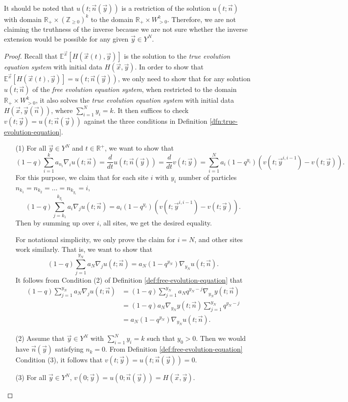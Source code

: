 \begin{remark}
It should be noted that $u(t;\vec{n}(\vec{y}))$ is a restriction of the solution $u(t;\vec{n})$ with domain $\mathbb{R}_+ \times (\mathbb{Z}_{\ge 0})^k$ to the domain $\mathbb{R}_+ \times W_{>0}^k$. Therefore, we are not claiming the truthness of the inverse because we are not sure whether the inverse extension would be possible for any given $\vec{y} \in Y^N$.
\end{remark}

\begin{proof}
Recall that $\mathbb{E}^{\vec{x}}[H(\vec{x}(t), \vec{y})]$ is the solution to the \emph{true evolution equation system} with initial data $H(\vec{x}, \vec{y})$. In order to show that $\mathbb{E}^{\vec{x}}[H(\vec{x}(t), \vec{y})] = u(t;\vec{n}(\vec{y}))$, we only need to show that for any solution $u(t;\vec{n})$ of the \emph{free evolution equation system}, when restricted to the domain $\mathbb{R}_+ \times W_{>0}^k$, it also solves the \emph{true evolution equation system} with initial data $H(\vec{x},\vec{y}(\vec{n}))$, where $\sum_{i=1}^{N} y_i = k$. It then suffices to check $v(t;\vec{y}) = u(t; \vec{n}(\vec{y}))$ against the three conditions in Definition \ref{dfn:true-evolution-equation}. 
\begin{enumerate}
\item[(1)] For all $\vec{y} \in Y^N$ and $t \in \mathbb{R}^+$, we want to show that $$(1-q) \sum_{i=1}^{k} a_{n_i} \nabla_i u(t;\vec{n}) = \frac{d}{dt} u(t;\vec{n}(\vec{y}))= \frac{d}{dt} v(t;\vec{y}) = \sum_{i=1}^{N} a_i (1-q^{y_i}) (v(t;\vec{y}^{i,i-1}) - v(t;\vec{y})).$$ For this purpose, we claim that for each site $i$ with $y_i$ number of particles $n_{k_1} = n_{k_2} = \dots = n_{k_{y_i}} = i$, $$(1-q) \sum_{j=k_1}^{k_{y_i}} a_{i} \nabla_j u(t;\vec{n}) = a_i (1-q^{y_i}) (v(t;\vec{y}^{i,i-1}) - v(t;\vec{y})).$$ Then by summing up over $i$, all sites, we get the desired equality. 

For notational simplicity, we only prove the claim for $i = N$, and other sites work similarly. That is, we want to show that $$(1-q) \sum_{j=1}^{y_N} a_{N} \nabla_j u(t;\vec{n}) = a_N (1-q^{y_N}) \nabla_{y_N} u(t;\vec{n}).$$
It follows from Condition (2) of Definition \ref{def:free-evolution-equation} that
\begin{align*}
(1-q) \sum_{j=1}^{y_N} a_{N} \nabla_j u(t;\vec{n}) &= (1-q) \sum_{j=1}^{y_N} a_{N} q^{y_N - j} \nabla_{y_N} y(t;\vec{n})\\
&= (1-q) a_{N} \nabla_{y_N} y(t;\vec{n}) \sum_{j=1}^{y_N} q^{y_N - j}\\
&= a_N (1-q^{y_N}) \nabla_{y_N} u(t;\vec{n}).
\end{align*}
\item[(2)] Assume that $\vec{y} \in Y^N$ with $\sum_{i=1}^{N} y_i = k$ such that $y_0 > 0$. Then we would have $\vec{n}(\vec{y})$ satisfying $n_k = 0$. From Definition \ref{def:free-evolution-equation} Condition (3), it follows that $v(t;\vec{y}) = u(t;\vec{n}(\vec{y})) = 0$.
\item[(3)] For all $\vec{y} \in Y^N$, $v(0;\vec{y}) = u(0; \vec{n}(\vec{y})) = H(\vec{x},\vec{y})$.
\end{enumerate}
\end{proof}

